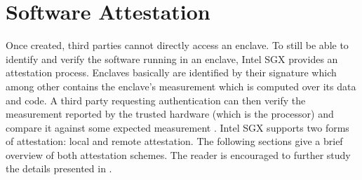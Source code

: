 \section{Software Attestation}
Once created, third parties cannot directly access an enclave. To still be able to identify and verify the software running in an enclave, Intel SGX provides an attestation process.
Enclaves basically are identified by their signature which among other contains the enclave's measurement which is computed over its data and code. A third party requesting
authentication can then verify the measurement reported by the trusted hardware (which is the processor) and compare it against some expected measurement \cite{Costan2016IntelSE}.
Intel SGX supports two forms of attestation: local and remote attestation. The following sections give a brief overview of both attestation schemes. The reader is encouraged to
further study the details presented in \cite{Costan2016IntelSE}.

